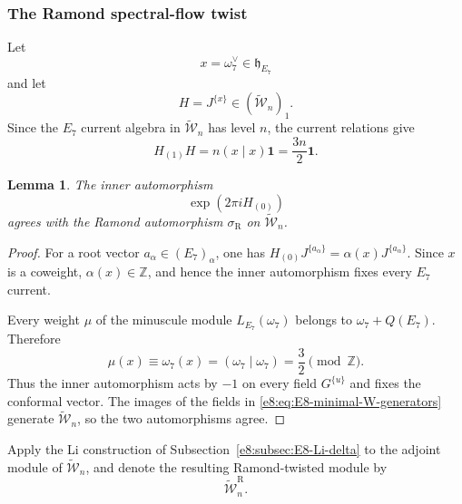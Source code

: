 \documentclass[11pt,reqno]{amsart}
\newtheorem{lemma}[theorem]{Lemma}
\theoremstyle{definition}
\theoremstyle{remark}
\providecommand{\Z}{\mathbb{Z}}
\providecommand{\Vac}{\mathbf{1}}
\providecommand{\W}{\mathcal{W}}
\begin{document}
\subsubsection{The Ramond spectral-flow twist}


Let
\begin{equation*}
  x=\omega_7^\vee\in\mathfrak h_{E_7}
\end{equation*}
and let
\begin{equation*}
  H=J^{\{x\}}\in (\widetilde{\W}_n)_1.
\end{equation*}
Since the $E_7$ current algebra in $\widetilde{\W}_n$ has level $n$, the
current relations give
\begin{equation}
  H_{(1)}H=n(x\mid x)\Vac=\frac{3n}{2}\Vac.
  \label{e8:eq:E8-H-one-H-value}
\end{equation}

\begin{lemma}

The inner automorphism
\begin{equation*}
  \exp(2\pi iH_{(0)})
\end{equation*}
agrees with the Ramond automorphism $\sigma_{\mathrm R}$ on
$\widetilde{\W}_n$.
\end{lemma}

\begin{proof}
For a root vector $a_\alpha\in(E_7)_\alpha$, one has
$H_{(0)}J^{\{a_\alpha\}}=\alpha(x)J^{\{a_\alpha\}}$.  Since $x$ is a
coweight, $\alpha(x)\in\Z$, and hence the inner automorphism fixes every
$E_7$ current.

Every weight $\mu$ of the minuscule module $L_{E_7}(\omega_7)$ belongs to
$\omega_7+Q(E_7)$.  Therefore
\begin{equation}
  \mu(x)\equiv\omega_7(x)
  =(\omega_7\mid\omega_7)=\frac32\pmod{\Z}.
  \label{e8:eq:E8-minuscule-x-charge-congruence}
\end{equation}
Thus the inner automorphism acts by $-1$ on every field $G^{\{u\}}$ and
fixes the conformal vector.  The images of the fields in
\eqref{e8:eq:E8-minimal-W-generators} generate $\widetilde{\W}_n$, so the two
automorphisms agree.
\end{proof}

Apply the Li construction of Subsection~\ref{e8:subsec:E8-Li-delta} to the
adjoint module of $\widetilde{\W}_n$, and denote the resulting Ramond-twisted
module by
\begin{equation*}
  \widetilde{\W}_n^{\mathrm R}.
\end{equation*}
\end{document}
